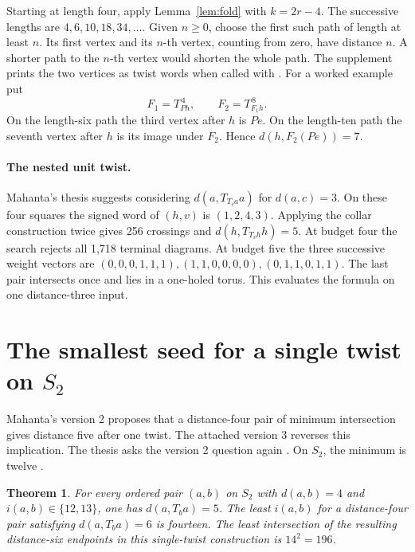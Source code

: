 \documentclass[11pt,a4paper]{article}
\newtheorem{theorem}{Theorem}
\newcommand{\ttcode}[1]{\texttt{\detokenize{#1}}}
\begin{document}
Starting at length four, apply Lemma~\ref{lem:fold} with \(k=2r-4\).
The successive lengths are \(4,6,10,18,34,\ldots\). Given \(n\ge0\),
choose the first such path of length at least \(n\). Its first vertex
and its \(n\)-th vertex, counting from zero, have distance \(n\).
A shorter path to the \(n\)-th vertex would shorten the whole path.
The supplement prints the two vertices as twist words when called with
\ttcode{--distance N}. For a worked example put
\[
       F_1=T_{Ph}^{\,4},\qquad F_2=T_{F_1h}^{\,8}.
\]
On the length-six path the third vertex after \(h\) is \(Pe\).
On the length-ten path the seventh vertex after \(h\) is its image under
\(F_2\). Hence \(d(h,F_2(Pe))=7\).

\paragraph{The nested unit twist.}
Mahanta's thesis \cite[\S1.2, p.~6]{MT} suggests considering
\(d(a,T_{T_c a}a)\) for \(d(a,c)=3\). On these four squares the signed
word of \((h,v)\) is \((1,2,4,3)\). Applying the collar construction
twice gives 256 crossings and \(d(h,T_{T_v h}h)=5\). At budget four the
search rejects all 1,718 terminal diagrams. At budget five the three
successive weight vectors are
\((0,0,0,1,1,1),(1,1,0,0,0,0),(0,1,1,0,1,1)\).
The last pair intersects once and lies in a one-holed torus. This
evaluates the formula on one distance-three input.

\clearpage
\section{The smallest seed for a single twist on \texorpdfstring{\(S_2\)}{S2}}\label{sec:census}
Mahanta's version 2 proposes that a distance-four pair of minimum
intersection gives distance five after one twist. The attached
version 3 reverses this implication. The thesis asks the version 2
question again \cite[p.~2 in each version]{M}\cite[\S1.2, Question~4]{MT}.
On \(S_2\), the minimum is twelve \cite[Theorem~1.6]{GMMM}.

\begin{theorem}\label{thm:census}
For every ordered pair \((a,b)\) on \(S_2\) with \(d(a,b)=4\) and
\(i(a,b)\in\{12,13\}\), one has \(d(a,T_ba)=5\). The least
\(i(a,b)\) for a distance-four pair satisfying \(d(a,T_ba)=6\) is
fourteen. The least intersection of the resulting distance-six endpoints
in this single-twist construction is \(14^2=196\).
\end{theorem}
\end{document}
